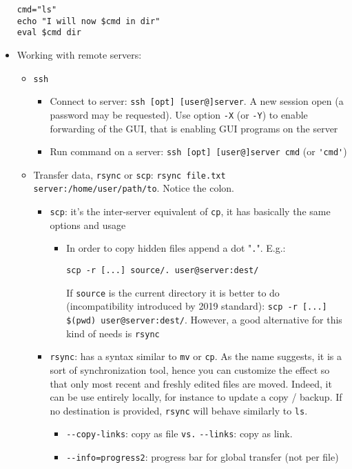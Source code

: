 \documentclass[a4paper,12pt,%
              final%
              ]{article}
\begin{document}
\begin{itemize}
\begin{verbatim}
cmd="ls"
echo "I will now $cmd in dir"
eval $cmd dir
\end{verbatim}
  \item Working with remote servers:
    \begin{itemize}
      \item \texttt{ssh}
        \begin{itemize}
          \item Connect to server: \verb|ssh [opt] [user@]server|. A new session open (a password may be requested). Use option \verb|-X| (or \verb|-Y|) to enable forwarding of the GUI, that is enabling GUI programs on the server
          \item Run command on a server: \verb|ssh [opt] [user@]server cmd| (or \verb|'cmd'|)
        \end{itemize}
      \item Transfer data, \texttt{rsync} or \texttt{scp}: \verb|rsync file.txt server:/home/user/path/to|. Notice the colon.
        \begin{itemize}
          \item \texttt{scp}: it's the inter-server equivalent of \texttt{cp}, it has basically the same options and usage
            \begin{itemize}
              \item In order to copy hidden files append a dot "\texttt{.}". E.g.:
\begin{verbatim}
scp -r [...] source/. user@server:dest/
\end{verbatim}
                If \texttt{source} is the current directory it is better to do (incompatibility introduced by 2019 standard): \verb|scp -r [...] $(pwd) user@server:dest/|. However, a good alternative for this kind of needs is \verb|rsync|
            \end{itemize}
          \item \texttt{rsync}: has a syntax similar to \texttt{mv} or \texttt{cp}. As the name suggests, it is a sort of synchronization tool, hence you can customize the effect so that only most recent and freshly edited files are moved. Indeed, it can be use entirely locally, for instance to update a copy / backup. If no destination is provided, \texttt{rsync} will behave similarly to \texttt{ls}.
            \begin{itemize}
              \item \verb|--copy-links|: copy as file \texttt{vs.} \verb|--links|: copy as link.
              \item \verb|--info=progress2|: progress bar for global transfer (not per file)

\end{itemize}
\end{itemize}
\end{itemize}
\end{itemize}
\end{document}
